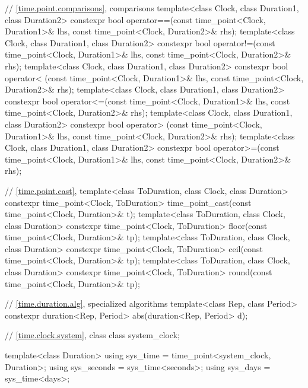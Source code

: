 \begin{codeblock}
{{    // \ref{time.point.comparisons},  comparisons
    template<class Clock, class Duration1, class Duration2>
       constexpr bool operator==(const time_point<Clock, Duration1>& lhs,
                                 const time_point<Clock, Duration2>& rhs);
    template<class Clock, class Duration1, class Duration2>
       constexpr bool operator!=(const time_point<Clock, Duration1>& lhs,
                                 const time_point<Clock, Duration2>& rhs);
    template<class Clock, class Duration1, class Duration2>
       constexpr bool operator< (const time_point<Clock, Duration1>& lhs,
                                 const time_point<Clock, Duration2>& rhs);
    template<class Clock, class Duration1, class Duration2>
       constexpr bool operator<=(const time_point<Clock, Duration1>& lhs,
                                 const time_point<Clock, Duration2>& rhs);
    template<class Clock, class Duration1, class Duration2>
       constexpr bool operator> (const time_point<Clock, Duration1>& lhs,
                                 const time_point<Clock, Duration2>& rhs);
    template<class Clock, class Duration1, class Duration2>
       constexpr bool operator>=(const time_point<Clock, Duration1>& lhs,
                                 const time_point<Clock, Duration2>& rhs);

    // \ref{time.point.cast}, 
    template<class ToDuration, class Clock, class Duration>
      constexpr time_point<Clock, ToDuration>
        time_point_cast(const time_point<Clock, Duration>& t);
    template<class ToDuration, class Clock, class Duration>
      constexpr time_point<Clock, ToDuration> floor(const time_point<Clock, Duration>& tp);
    template<class ToDuration, class Clock, class Duration>
      constexpr time_point<Clock, ToDuration> ceil(const time_point<Clock, Duration>& tp);
    template<class ToDuration, class Clock, class Duration>
      constexpr time_point<Clock, ToDuration> round(const time_point<Clock, Duration>& tp);

    // \ref{time.duration.alg}, specialized algorithms
    template<class Rep, class Period>
      constexpr duration<Rep, Period> abs(duration<Rep, Period> d);

    // \ref{time.clock.system}, class 
    class system_clock;

    template<class Duration>
      using sys_time  = time_point<system_clock, Duration>;
    using sys_seconds = sys_time<seconds>;
    using sys_days    = sys_time<days>;

}}
\end{codeblock}
